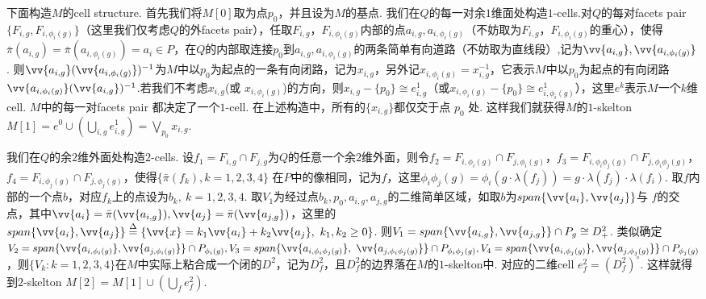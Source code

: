 \documentclass{article}
\theoremstyle{plain}%
\theoremstyle{definition}
\theoremstyle{remark}
\begin{document}
{下面构造$M$的cell structure.
首先我们将$M[0]$取为点$p_0$，并且设为$M$的基点.
我们在$Q$的每一对余$1$维面处构造$1$-cells.对$Q$的每对facets pair$\{F_{i,g},F_{i,\phi_i(g)}\}$（这里我们仅考虑$Q$的外facets pair），任取$F_{i,g}$，$F_{i,\phi_i(g)}$内部的点$a_{i,g},a_{i,\phi_i(g)}$（不妨取为$F_{i,g}$，$F_{i,\phi_i(g)}$的重心），使得$\bar{\pi}(a_{i,g})=\bar{\pi}(a_{i,\phi_i(g)})=a_i\in P$，在$Q$的内部取连接$p_0$到$a_{i,g},a_{i,\phi_i(g)}$的两条简单有向道路（不妨取为直线段）,记为$\vv{a_{i,g}},\vv{a_{i,\phi_i(g)}}$. 则$\vv{a_{i,g}}(\vv{a_{i,\phi_i(g)}})^{-1}$为$M$中以$p_0$为起点的一条有向闭路，记为$x_{i,g}$，另外记$x_{i,\phi_i(g)}=x_{i,g}^{-1}$，它表示$M$中以$p_0$为起点的有向闭路$\vv{a_{i,\phi_i(g)}}(\vv{a_{i,g}})^{-1}$.若我们不考虑$x_{i,g}$(或 $x_{i,\phi_i(g)}$)的方向，则$x_{i,g}-\{p_0\}\cong e_{i,g}^1$（或$x_{i,\phi_i(g)}-\{p_0\}\cong e_{i,\phi_i(g)}^1$），这里$e^k$表示$M$一个$k$维cell. $M$中的每一对facets pair 都决定了一个$1$-cell. 在上述构造中，所有的$\{x_{i,g}\}$都仅交于点 $p_0$ 处. 这样我们就获得$M$的$1$-skelton $M[1]=e^0\cup(\bigcup\limits_{i,g} e_{i,g}^1)=\bigvee\limits_{p_0} x_{i,g}$. 
\begin{figure}[h]
\centering
\def\svgwidth{0.9\textwidth}

\end{figure}

我们在$Q$的余$2$维外面处构造$2$-cells. 设$f_1=F_{i,g}\cap F_{j,g}$为$Q$的任意一个余$2$维外面，则令$f_2=F_{i,\phi_i(g)}\cap F_{j,\phi_i(g)}$，$f_3=F_{i,\phi_i\phi_j(g)}\cap F_{j,\phi_i\phi_j(g)}$，$f_4=F_{i,\phi_j(g)}\cap F_{j,\phi_j(g)}$，使得$\{\bar{\pi}(f_k),k=1,2,3,4\}$ 在$P$中的像相同，记为$f$，这里$\phi_i\phi_j(g)=\phi_i(g\cdot \lambda(f_j))=g\cdot \lambda(f_j)\cdot \lambda(f_i)$. 取$f$内部的一个点$b$，对应$f_k$上的点设为$b_k,~k=1,2,3,4$. 取$V_1$为经过点$b_k,p_0,a_{i,g},a_{j,g}$的二维简单区域，如取$b$为$span\{\vv{a_i},\vv{a_j}\}$与 $f$的交点，其中$\vv{a_i}=\bar{\pi}(\vv{a_{i,g}}), \vv{a_j}=\bar{\pi}(\vv{a_{j,g}})$，这里的$span\{\vv{a_i},\vv{a_j}\}\overset{\Delta}{=}\{\vv{x}=k_1\vv{a_i}+k_2\vv{a_j},~k_1,k_2\geq 0\}$. 则$V_1=span\{\vv{a_{i,g}},\vv{a_{j,g}}\}\cap P_g \cong D_{+}^2$. 
类似确定$V_2=span\{\vv{a_{i,\phi_i(g)}},\vv{a_{j,\phi_i(g)}}\}\cap P_{\phi_i(g)},V_3=span\{\vv{a_{i,\phi_i\phi_j(g)}},\\~\vv{a_{j,\phi_i\phi_j(g)}}\}\cap P_{\phi_i\phi_j(g)},V_4=span\{\vv{a_{i,\phi_j(g)}},\vv{a_{j,\phi_j(g)}}\}\cap P_{\phi_j(g)}$，则$\{V_k:k=1,2,3,4\}$在$M$中实际上粘合成一个闭的$D^2$，记为$D^2_f$，且$D^2_f$的边界落在$M$的$1$-skelton中. 对应的二维cell $e_f^2=(D^2_f)^{\circ}$. 这样就得到$2$-skelton $M[2]=M[1]\cup (\bigcup\limits_{f}e_f^2)$.

}
\end{document}
